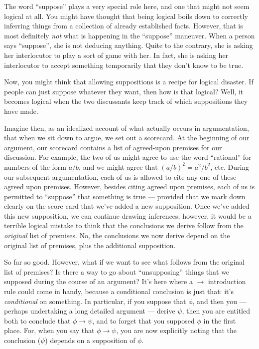 The word ``suppose'' plays a very special role here, and one that
might not seem logical at all.  You might have thought that being
logical boils down to correctly inferring things from a collection of
already established facts.  However, that is most definitely {\it not}
what is happening in the ``suppose'' maneuver.  When a person says
``suppose'', she is not deducing anything.  Quite to the contrary, she
is asking her interlocutor to play a sort of game with her.  In fact,
she is asking her interlocutor to accept something temporarily that
they don't know to be true.

Now, you might think that allowing suppositions is a recipe for
logical disaster.  If people can just suppose whatever they want, then
how is that logical?  Well, it becomes logical when the two
discussants keep track of which suppositions they have made.

Imagine then, as an idealized account of what actually occurs in
argumentation, that when we sit down to argue, we set out a scorecard.
At the beginning of our argument, our scorecard contains a list of
agreed-upon premises for our discussion.  For example, the two of us
might agree to use the word ``rational'' for numbers of the form
$a/b$, and we might agree that $(a/b)^2=a^2/b^2$, etc.  During our
subsequent argumentation, each of us is allowed to cite any one of
these agreed upon premises.  However, besides citing agreed upon
premises, each of us is permitted to ``suppose'' that something is
true --- provided that we mark down clearly on the score card that
we've added a new supposition.  Once we've added this new supposition,
we can continue drawing inferences; however, it would be a terrible
logical mistake to think that the conclusions we derive follow from
the {\it original} list of premises.  No, the conclusions we now
derive depend on the original list of premises, plus the additional
supposition.

So far so good.  However, what if we want to see what follows from the
original list of premises?  Is there a way to go about ``unsupposing''
things that we supposed during the course of an argument?  It's here
where a $\to$ introduction rule could come in handy, because a
conditional conclusion is just that: it's {\it conditional} on
something.  In particular, if you suppose that $\phi$, and then you
--- perhaps undertaking a long detailed argument --- derive $\psi$,
then you are entitled both to conclude that $\phi\to \psi$, and to
forget that you supposed $\phi$ in the first place.  For, when you say
that $\phi\to \psi$, you are now explicitly noting that the conclusion
($\psi$) depends on a supposition of $\phi$.

